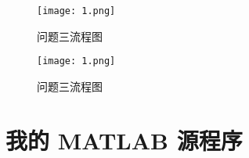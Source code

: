 \documentclass[bwprint]{gmcmthesis}
\begin{document}
\begin{figure}[!htbp]
    \begin{minipage}{0.48\linewidth}
        \centering
        \texttt{[image: 1.png]}
        \caption{问题三流程图}\label{问题}
    \end{minipage}
    \begin{minipage}{0.48\linewidth}
        \centering
        \texttt{[image: 1.png]}
        \caption{问题三流程图}\label{wenti4}
    \end{minipage}
\end{figure}

\newpage
\quad
\newpage





\cite{mittelbach_latex_2004,wright_latex3_2009,beeton_unicode_2008,vieth_experiences_2009}


\newpage
\appendix
\section{我的 MATLAB 源程序}

\end{document}
